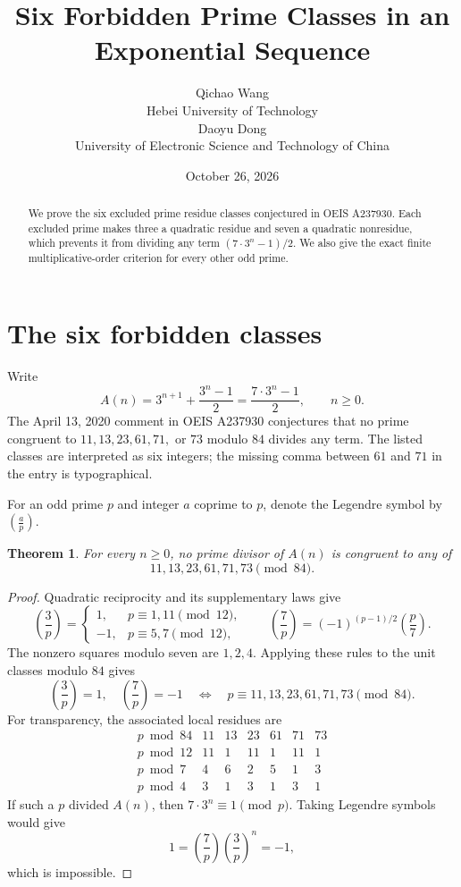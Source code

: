 \documentclass[10pt]{article}
\title{Six Forbidden Prime Classes in an Exponential Sequence}
\author{Qichao Wang\\{\small Hebei University of Technology}\\[0.3em]
Daoyu Dong\\{\small University of Electronic Science and Technology of China}}
\date{October 26, 2026}
\newtheorem{theorem}{Theorem}
\begin{document}
\maketitle
\begin{abstract}
We prove the six excluded prime residue classes conjectured in
OEIS A237930. Each excluded prime makes three a quadratic residue
and seven a quadratic nonresidue, which prevents it from dividing
any term $(7\cdot3^n-1)/2$. We also give the exact finite
multiplicative-order criterion for every other odd prime.
\end{abstract}

\section{The six forbidden classes}
Write
\[
 A(n)=3^{n+1}+\frac{3^n-1}{2}=\frac{7\cdot3^n-1}{2},\qquad n\ge0.
\]
The April 13, 2020 comment in OEIS A237930 conjectures that no
prime congruent to $11,13,23,61,71,$ or $73$ modulo $84$ divides
any term. The listed classes are interpreted as six integers;
the missing comma between $61$ and $71$ in the entry is typographical.

For an odd prime $p$ and integer $a$ coprime to $p$, denote the
Legendre symbol by $\left(\frac ap\right)$.
\begin{theorem}
For every $n\ge0$, no prime divisor of $A(n)$ is congruent to any of
\[
 11,13,23,61,71,73\pmod{84}.
\]
\end{theorem}
\begin{proof}
Quadratic reciprocity and its supplementary laws give
\[
 \left(\frac3p\right)=
 \begin{cases}1,&p\equiv1,11\pmod{12},\\-1,&p\equiv5,7\pmod{12},\end{cases}
 \qquad
 \left(\frac7p\right)=(-1)^{(p-1)/2}\left(\frac p7\right).
\]
The nonzero squares modulo seven are $1,2,4$. Applying these
rules to the unit classes modulo $84$ gives
\[
 \left(\frac3p\right)=1,\quad\left(\frac7p\right)=-1
 \quad\Longleftrightarrow\quad
 p\equiv11,13,23,61,71,73\pmod{84}.
\]
For transparency, the associated local residues are
\[
\begin{array}{c|rrrrrr}
 p\bmod84&11&13&23&61&71&73\\\hline
 p\bmod12&11&1&11&1&11&1\\
 p\bmod7&4&6&2&5&1&3\\
 p\bmod4&3&1&3&1&3&1
\end{array}
\]
If such a $p$ divided $A(n)$, then $7\cdot3^n\equiv1\pmod p$.
Taking Legendre symbols would give
\[
 1=\left(\frac7p\right)\left(\frac3p\right)^n=-1,
\]
which is impossible.
\end{proof}
\end{document}

